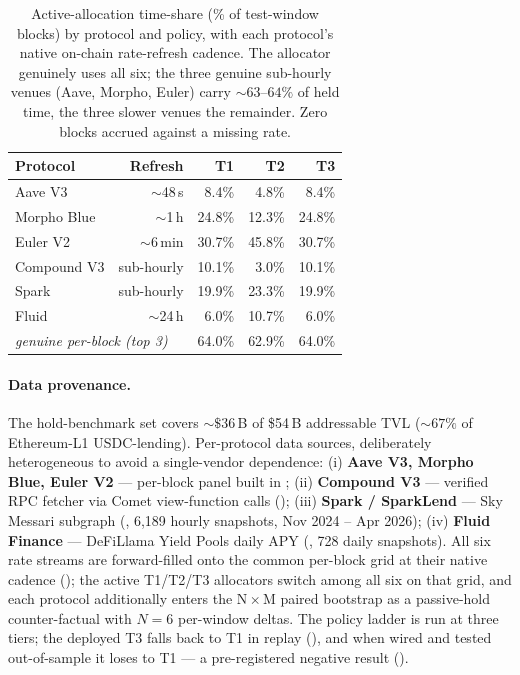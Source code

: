 \begin{table}[t]
  \centering
  \caption{Active-allocation time-share (\% of test-window blocks)
    by protocol and policy, with each protocol's native on-chain
    rate-refresh cadence.  The allocator genuinely uses all six;
    the three genuine sub-hourly venues (Aave, Morpho, Euler) carry
    $\sim 63$--$64\%$ of held time, the three slower venues the
    remainder.  Zero blocks accrued against a missing rate.}
  \label{tab:timeshare}
  \setlength{\tabcolsep}{4pt}
  \begin{tabular}{lrrrr}
    \toprule
    Protocol & Refresh & T1 & T2 & T3 \\
    \midrule
    Aave V3      & $\sim$48\,s  & 8.4\%  & 4.8\%  & 8.4\% \\
    Morpho Blue  & $\sim$1\,h   & 24.8\% & 12.3\% & 24.8\% \\
    Euler V2     & $\sim$6\,min & 30.7\% & 45.8\% & 30.7\% \\
    Compound V3  & sub-hourly   & 10.1\% & 3.0\%  & 10.1\% \\
    Spark        & sub-hourly   & 19.9\% & 23.3\% & 19.9\% \\
    Fluid        & $\sim$24\,h  & 6.0\%  & 10.7\% & 6.0\% \\
    \midrule
    \multicolumn{2}{l}{\emph{genuine per-block (top 3)}}
                 & 64.0\% & 62.9\% & 64.0\% \\
    \bottomrule
  \end{tabular}
\end{table}

\paragraph{Data provenance.}
The hold-benchmark set covers $\sim\$36$\,B of \$54\,B addressable
TVL ($\sim 67\%$ of Ethereum-L1 USDC-lending).  Per-protocol
data sources, deliberately heterogeneous to avoid a single-vendor
dependence:
(i) \textbf{Aave V3, Morpho Blue, Euler V2} — per-block panel built
in ;
(ii) \textbf{Compound V3} — verified RPC fetcher via Comet
view-function calls ();
(iii) \textbf{Spark / SparkLend} — Sky Messari subgraph
(, 6{,}189 hourly snapshots,
Nov 2024 -- Apr 2026);
(iv) \textbf{Fluid Finance} — DeFiLlama Yield Pools daily APY
(, 728 daily snapshots).
All six rate streams are forward-filled onto the common per-block
grid at their native cadence (); the active
T1/T2/T3 allocators switch among all six on that grid, and each
protocol additionally enters the N\,$\times$\,M paired bootstrap as
a passive-hold counter-factual with $N=6$ per-window deltas.  The
policy ladder is run at three tiers; the deployed T3 falls back to
T1 in replay (), and when wired and tested
out-of-sample it loses to T1 --- a pre-registered negative result
().

